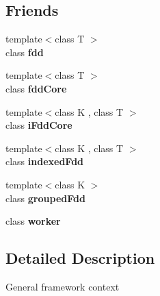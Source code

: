 \subsection*{Friends}
\begin{DoxyCompactItemize}
\item 
\hypertarget{classfaster_1_1fastContext_a4fef19fb2fc81aa8f7f34f9401f30a6a}{}{\footnotesize template$<$class T $>$ }\\class {\bfseries fdd}\label{classfaster_1_1fastContext_a4fef19fb2fc81aa8f7f34f9401f30a6a}

\item 
\hypertarget{classfaster_1_1fastContext_a351468342339dbaff3d4c867f62ff479}{}{\footnotesize template$<$class T $>$ }\\class {\bfseries fdd\+Core}\label{classfaster_1_1fastContext_a351468342339dbaff3d4c867f62ff479}

\item 
\hypertarget{classfaster_1_1fastContext_accc85d808e1894334219d2e9806c0624}{}{\footnotesize template$<$class K , class T $>$ }\\class {\bfseries i\+Fdd\+Core}\label{classfaster_1_1fastContext_accc85d808e1894334219d2e9806c0624}

\item 
\hypertarget{classfaster_1_1fastContext_a0da7c6b1bc8838a587f28aa48122f8ae}{}{\footnotesize template$<$class K , class T $>$ }\\class {\bfseries indexed\+Fdd}\label{classfaster_1_1fastContext_a0da7c6b1bc8838a587f28aa48122f8ae}

\item 
\hypertarget{classfaster_1_1fastContext_a49b56a3cf60e23045ffa4f8edb5dc82d}{}{\footnotesize template$<$class K $>$ }\\class {\bfseries grouped\+Fdd}\label{classfaster_1_1fastContext_a49b56a3cf60e23045ffa4f8edb5dc82d}

\item 
\hypertarget{classfaster_1_1fastContext_a4636d2eabf003b9aa517f234ac288a6c}{}class {\bfseries worker}\label{classfaster_1_1fastContext_a4636d2eabf003b9aa517f234ac288a6c}

\end{DoxyCompactItemize}


\subsection{Detailed Description}
General framework context

